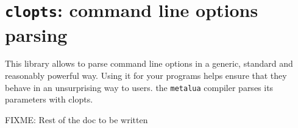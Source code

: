 \section{{\tt clopts}: command line options parsing}
This library allows to parse command line options in a generic, standard and
reasonably powerful way. Using it for your programs helps ensure that they
behave in an unsurprising way to users. the {\tt metalua} compiler parses its
parameters with clopts.

FIXME: Rest of the doc to be written

